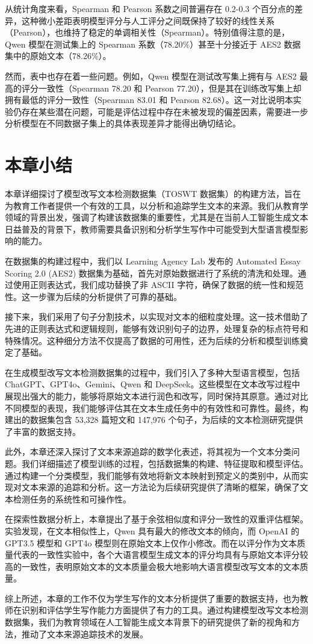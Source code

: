 从统计角度来看，Spearman 和 Pearson 系数之间普遍存在 0.2-0.3 个百分点的差异，这种微小差距表明模型评分与人工评分之间既保持了较好的线性关系（Pearson），也维持了稳定的单调相关性（Spearman）。特别值得注意的是，Qwen 模型在测试集上的 Spearman 系数（78.20\%）甚至十分接近于 AES2 数据集中的原始文本（78.26\%）。

然而，表中也存在着一些问题。例如，Qwen 模型在测试改写集上拥有与 AES2 最高的评分一致性（Spearman 78.20 和 Pearson 77.20），但是其在训练改写集上却拥有最低的评分一致性（Spearman 83.01 和 Pearson 82.68）。这一对比说明本实验仍存在某些潜在问题，可能是评估过程中存在未被发现的偏差因素，需要进一步分析模型在不同数据子集上的具体表现差异才能得出确切结论。

\section{本章小结}
\label{sec:TOSWT-conclusion}

本章详细探讨了模型改写文本检测数据集（TOSWT 数据集）的构建方法，旨在为教育工作者提供一个有效的工具，以分析和追踪学生文本的来源。我们从教育学领域的背景出发，强调了构建该数据集的重要性，尤其是在当前人工智能生成文本日益普及的背景下，教师需要具备识别和分析学生写作中可能受到大型语言模型影响的能力。

在数据集的构建过程中，我们以 Learning Agency Lab 发布的 Automated Essay Scoring 2.0 (AES2) 数据集为基础，首先对原始数据进行了系统的清洗和处理。通过使用正则表达式，我们成功替换了非 ASCII 字符，确保了数据的统一性和规范性。这一步骤为后续的分析提供了可靠的基础。

接下来，我们采用了句子分割技术，以实现对文本的细粒度处理。这一技术借助了先进的正则表达式和逻辑规则，能够有效识别句子的边界，处理复杂的标点符号和特殊情况。这种细分方法不仅提高了数据的可用性，还为后续的分析和模型训练奠定了基础。

在生成模型改写文本检测数据集的过程中，我们引入了多种大型语言模型，包括 ChatGPT、GPT4o、Gemini、Qwen 和 DeepSeek。这些模型在文本改写过程中展现出强大的能力，能够将原始文本进行润色和改写，同时保持其原意。通过对比不同模型的表现，我们能够评估其在文本生成任务中的有效性和可靠性。最终，构建出的数据集包含 53,328 篇短文和 147,976 个句子，为后续的文本检测研究提供了丰富的数据支持。

此外，本章还深入探讨了文本来源追踪的数学化表述，将其视为一个文本分类问题。我们详细描述了模型训练的过程，包括数据集的构建、特征提取和模型评估。通过构建一个分类模型，我们能够有效地将新文本映射到预定义的类别中，从而实现对文本来源的追踪和分析。这一方法论为后续研究提供了清晰的框架，确保了文本检测任务的系统性和可操作性。

在探索性数据分析上，本章提出了基于余弦相似度和评分一致性的双重评估框架。实验发现，在文本相似性上，Qwen 具有最大的修改文本的倾向，而 OpenAI 的 GPT3.5 模型和 GPT4o 模型则在原始文本上仅作小修改。而在以评分作为文本质量代表的一致性实验中，各个大语言模型生成文本的评分均具有与原始文本评分较高的一致性，表明原始文本的文本质量会极大地影响大语言模型改写文本的文本质量。

综上所述，本章的工作不仅为学生写作的文本分析提供了重要的数据支持，也为教师在识别和评估学生写作能力方面提供了有力的工具。通过构建模型改写文本检测数据集，我们为教育领域在人工智能生成文本背景下的研究提供了新的视角和方法，推动了文本来源追踪技术的发展。